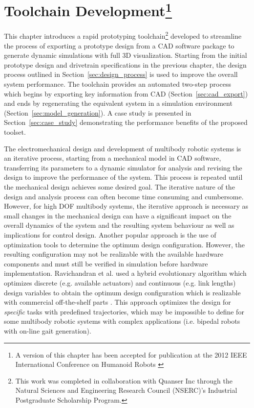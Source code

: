 \chapter[Toolchain Development]{Toolchain Development\footnote{A version of this chapter has been accepted for publication at the 2012 IEEE International Conference on Humanoid Robots \cite{ChoudhuryHumanoids2012}}} %
\label{cha:toolchain}

This chapter introduces a rapid prototyping toolchain\footnote{This work was completed in collaboration with Quanser Inc through the Natural Sciences and Engineering Research Council (NSERC)'s Industrial Postgraduate Scholarship Program.} developed to streamline the process of exporting a prototype design from a CAD software package to generate dynamic simulations with full 3D visualization. Starting from the initial prototype design and drivetrain specifications in the previous chapter, the design process outlined in Section~\ref{sec:design_process} is used to improve the overall system performance. The toolchain provides an automated two-step process which begins by exporting key information from CAD (Section~\ref{sec:cad_export}) and ends by regenerating the equivalent system in a simulation environment (Section~\ref{sec:model_generation}). A case study is presented in Section~\ref{sec:case_study} demonstrating the performance benefits of the proposed toolset. 

The electromechanical design and development of multibody robotic systems is an iterative process, starting from a mechanical model in CAD software, transferring its parameters to a dynamic simulator for analysis and revising the design to improve the performance of the system. This process is repeated until the mechanical design achieves some desired goal. The iterative nature of the design and analysis process can often become time consuming and cumbersome. However, for high DOF multibody systems, the iterative approach is necessary as small changes in the mechanical design can have a significant impact on the overall dynamics of the system and the resulting system behaviour as well as implications for control design. Another popular approach is the use of optimization tools \cite{Paul2001,Wollherr2002} to determine the optimum design configuration. However, the resulting configuration may not be realizable with the available hardware components and must still be verified in simulation before hardware implementation. Ravichandran et al. used a hybrid evolutionary algorithm which optimizes discrete (e.g. available actuators) and continuous (e.g. link lengths) design variables to obtain the optimum design configuration which is realizable with commercial off-the-shelf parts \cite{Ravichandran:2004}. This approach optimizes the design for \emph{specific} tasks with predefined trajectories, which may be impossible to define for some multibody robotic systems with complex applications (i.e. bipedal robots with on-line gait generation). 

